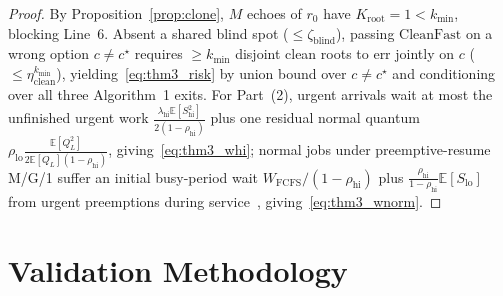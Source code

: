\documentclass[conference]{IEEEtran}
\theoremstyle{definition}
\theoremstyle{remark}
\newcommand{\E}{\mathbb{E}}
\begin{document}
\begin{proof}
By Proposition~\ref{prop:clone}, $M$ echoes of $r_0$ have $K_{\mathrm{root}} = 1 < k_{\min}$, blocking Line~6. Absent a shared blind spot ($\le \zeta_{\mathrm{blind}}$), passing $\mathrm{CleanFast}$ on a wrong option $c \neq c^\star$ requires $\ge k_{\min}$ disjoint clean roots to err jointly on $c$ ($\le \eta_{\mathrm{clean}}^{k_{\min}}$), yielding~\eqref{eq:thm3_risk} by union bound over $c \neq c^\star$ and conditioning over all three Algorithm~1 exits. For Part~(2), urgent arrivals wait at most the unfinished urgent work $\frac{\lambda_{\mathrm{hi}}\E[S_{\mathrm{hi}}^2]}{2(1 - \rho_{\mathrm{hi}})}$ plus one residual normal quantum $\rho_{\mathrm{lo}}\frac{\E[Q_L^2]}{2\E[Q_L](1 - \rho_{\mathrm{hi}})}$, giving~\eqref{eq:thm3_whi}; normal jobs under preemptive-resume M/G/1 suffer an initial busy-period wait $W_{\mathrm{FCFS}}/(1 - \rho_{\mathrm{hi}})$ plus $\frac{\rho_{\mathrm{hi}}}{1 - \rho_{\mathrm{hi}}}\E[S_{\mathrm{lo}}]$ from urgent preemptions during service~\cite{harcholbalter2013perf}, giving~\eqref{eq:thm3_wnorm}.
\end{proof}

\section{Validation Methodology}\label{sec:setup}
\end{document}
